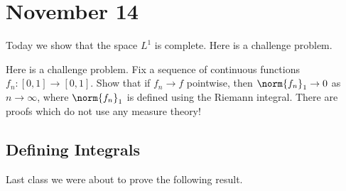 \documentclass[../notes.tex]{subfiles}
\begin{document}
\section{November 14}

Today we show that the space $L^1$ is complete. Here is a challenge problem.
\begin{remark}
	Here is a challenge problem. Fix a sequence of continuous functions $f_n\colon[0,1]\to[0,1]$. Show that if $f_n\to f$ pointwise, then $\norm{f_n}_1\to0$ as $n\to\infty$, where $\norm{f_n}_1$ is defined using the Riemann integral. There are proofs which do not use any measure theory!
\end{remark}

\subsection{Defining Integrals}
Last class we were about to prove the following result.
\intisdefinedprop*
\end{document}
